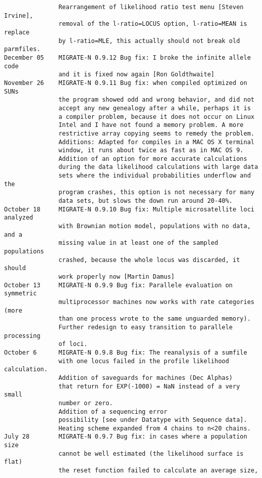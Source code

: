 \begin{small}
\begin{verbatim}
               Rearrangement of likelihood ratio test menu [Steven Irvine], 
               removal of the l-ratio=LOCUS option, l-ratio=MEAN is replace 
               by l-ratio=MLE, this actually should not break old parmfiles. 
December 05    MIGRATE-N 0.9.12 Bug fix: I broke the infinite allele code
               and it is fixed now again [Ron Goldthwaite]
November 26    MIGRATE-N 0.9.11 Bug fix: when compiled optimized on SUNs
               the program showed odd and wrong behavior, and did not
               accept any new genealogy after a while, perhaps it is
               a compiler problem, because it does not occur on Linux
               Intel and I have not found a memory problem. A more
               restrictive array copying seems to remedy the problem.
               Additions: Adapted for compiles in a MAC OS X terminal
               window, it runs about twice as fast as in MAC OS 9.
               Addition of an option for more accurate calculations 
               during the data likelihood calculations with large data
               sets where the individual probabilities underflow and the
               program crashes, this option is not necessary for many 
               data sets, but slows the down run around 20-40%.   
October 18     MIGRATE-N 0.9.10 Bug fix: Multiple microsatellite loci analyzed
               with Brownian motion model, populations with no data, and a
               missing value in at least one of the sampled populations 
               crashed, because the whole locus was discarded, it should 
               work properly now [Martin Damus] 
October 13     MIGRATE-N 0.9.9 Bug fix: Parallele evaluation on symmetric 
               multiprocessor machines now works with rate categories (more 
               than one process wrote to the same unguarded memory).
               Further redesign to easy transition to parallele processing 
               of loci. 
October 6      MIGRATE-N 0.9.8 Bug fix: The reanalysis of a sumfile
               with one locus failed in the profile likelihood calculation.
               Addition of saveguards for machines (Dec Alphas) 
               that return for EXP(-1000) = NaN instead of a very small 
               number or zero. 
               Addition of a sequencing error 
               possibility [see under Datatype with Sequence data]. 
               Heating scheme expanded from 4 chains to n<20 chains.
July 28        MIGRATE-N 0.9.7 Bug fix: in cases where a population size
               cannot be well estimated (the likelihood surface is flat)
               the reset function failed to calculate an average size, 

\end{verbatim}
\end{small}
